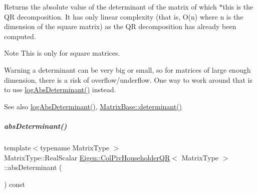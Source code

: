 \begin{DoxyReturn}{Returns}
the absolute value of the determinant of the matrix of which $\ast$this is the QR decomposition. It has only linear complexity (that is, O(n) where n is the dimension of the square matrix) as the QR decomposition has already been computed.
\end{DoxyReturn}
\begin{DoxyNote}{Note}
This is only for square matrices.
\end{DoxyNote}
\begin{DoxyWarning}{Warning}
a determinant can be very big or small, so for matrices of large enough dimension, there is a risk of overflow/underflow. One way to work around that is to use \hyperlink{group___q_r___module_afdc29438a335871f67449c253369ce12}{log\+Abs\+Determinant()} instead.
\end{DoxyWarning}
\begin{DoxySeeAlso}{See also}
\hyperlink{group___q_r___module_afdc29438a335871f67449c253369ce12}{log\+Abs\+Determinant()}, \hyperlink{group___core___module_a7ad8f77004bb956b603bb43fd2e3c061}{Matrix\+Base\+::determinant()} 
\end{DoxySeeAlso}
\mbox{\label{group___q_r___module_ac87c3bf42098d6f7324dafbc50fa83f7}} 
\subparagraph{\texorpdfstring{abs\+Determinant()}{absDeterminant()}\hspace{0.1cm}{\footnotesize\ttfamily [2/2]}}
{\footnotesize\ttfamily template$<$typename Matrix\+Type $>$ \\
Matrix\+Type\+::\+Real\+Scalar \hyperlink{group___q_r___module_class_eigen_1_1_col_piv_householder_q_r}{Eigen\+::\+Col\+Piv\+Householder\+QR}$<$ Matrix\+Type $>$\+::abs\+Determinant (\begin{DoxyParamCaption}{ }\end{DoxyParamCaption}) const}

